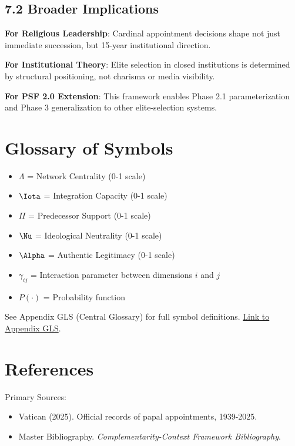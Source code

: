 \subsection{7.2 Broader Implications}

\textbf{For Religious Leadership}: Cardinal appointment decisions shape not just immediate succession, but 15-year institutional direction.

\textbf{For Institutional Theory}: Elite selection in closed institutions is determined by structural positioning, not charisma or media visibility.

\textbf{For PSF 2.0 Extension}: This framework enables Phase 2.1 parameterization and Phase 3 generalization to other elite-selection systems.

\section*{Glossary of Symbols}

\begin{itemize}
\item $\Lambda$ = Network Centrality (0-1 scale)
\item $\Iota$ = Integration Capacity (0-1 scale)
\item $\Pi$ = Predecessor Support (0-1 scale)
\item $\Nu$ = Ideological Neutrality (0-1 scale)
\item $\Alpha$ = Authentic Legitimacy (0-1 scale)
\item $\gamma_{ij}$ = Interaction parameter between dimensions $i$ and $j$
\item $P(\cdot)$ = Probability function
\end{itemize}

See Appendix GLS (Central Glossary) for full symbol definitions. \href{https://github.com/FehrAdvice-Partners-AG/complementarity-context-framework/appendices/G_glossary.tex}{Link to Appendix GLS}.

\section*{References}

\noindent
Primary Sources:
\begin{itemize}
\item Vatican (2025). Official records of papal appointments, 1939-2025.
\item \nocite{bcm_master} Master Bibliography. \textit{Complementarity-Context Framework Bibliography}.
\end{itemize}


